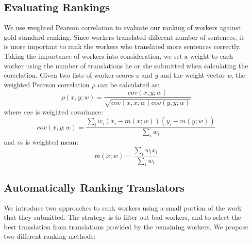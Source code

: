 \documentclass[11pt,letterpaper]{article}
\begin{document}

\subsection{Evaluating Rankings}
We use weighted Pearson correlation \cite{pozzi2012exponential} to evaluate our ranking of workers against gold standard ranking. Since workers translated different number of sentences, it is more important to rank the workers who translated more sentences correctly. Taking the importance of workers into consideration, we set a weight to each worker using the number of translations he or she submitted when calculating the correlation.
Given two lists of worker scores \textit{x} and \textit{y} and the weight vector \textit{w}, the weighted Pearson correlation $\rho$ can be calculated as:
\begin{equation}
\rho(x,y;w) = \frac{cov(x,y;w)}{\sqrt{cov(x,x;w)cov(y,y;w)}}
\end{equation}
where $cov$ is weighted covariance:
\begin{equation}
cov(x,y;w)  = \frac{\sum_i w_i (x_i - m(x;w))(y_i - m(y;w))}{\sum_i w_i}
\end{equation}
and $m$ is weighted mean:
\begin{equation} 
m(x;w)  =  \frac{\sum_{i} w_i x_i}{\sum_i w_i} 
\end{equation}

\subsection{Automatically Ranking Translators}

We introduce two approaches to rank workers using a small portion of the work that they submitted.  The strategy is to filter out bad workers, and to select the best translation from translations provided by the remaining workers. We propose two different ranking methods:


\end{document}
